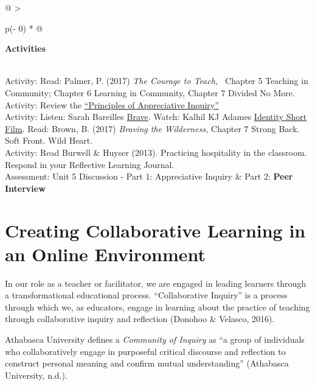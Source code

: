 \documentclass[
]{book}
\begin{document}
\begin{longtable}[]{@{}
  >{\raggedright\arraybackslash}p{(\columnwidth - 0\tabcolsep) * }@{}}
\toprule
\begin{minipage}[b]{\linewidth}\raggedright
\textbf{Activities}
\end{minipage} \\
\midrule
\endhead
Activity: Read: Palmer, P. (2017) \emph{The Courage to Teach,} ~Chapter 5 Teaching in Community; Chapter 6 Learning in Community, Chapter 7 Divided No More. \\
Activity: Review the \href{https://appreciativeinquiry.champlain.edu/learn/appreciative-inquiry-introduction/5-classic-principles-ai}{``Principles of Appreciative Inquiry''} \\
Activity: Listen: Sarah Bareilles \href{https://www.youtube.com/watch?v=QUQsqBqxoR4}{Brave}. Watch: Kalhil KJ Adames \href{https://www.youtube.com/watch?v=ikGVWEvUzNM}{Identity Short Film}. Read: Brown, B. (2017) \emph{Braving the Wilderness,} Chapter 7 Strong Back. Soft Front. Wild Heart. \\
Activity: Read Burwell \& Huyser (2013). Practicing hospitality in the classroom. Respond in your Reflective Learning Journal. \\
Assessment: Unit 5 Discussion - Part 1: Appreciative Inquiry \& Part 2: \textbf{Peer Interview} \\
\bottomrule
\end{longtable}

\hypertarget{creating-collaborative-learning-in-an-online-environment}{%
\section{Creating Collaborative Learning in an Online Environment}\label{creating-collaborative-learning-in-an-online-environment}}

In our role as a teacher or facilitator, we are engaged in leading learners through a transformational educational process. ``Collaborative Inquiry'' is a process through which we, as educators, engage in learning about the practice of teaching through collaborative inquiry and reflection (Donohoo \& Velasco, 2016).

Athabasca University defines a \emph{Community of Inquiry} as ``a group of individuals who collaboratively engage in purposeful critical discourse and reflection to construct personal meaning and confirm mutual understanding'' (Athabasca University, n.d.).
\end{document}
